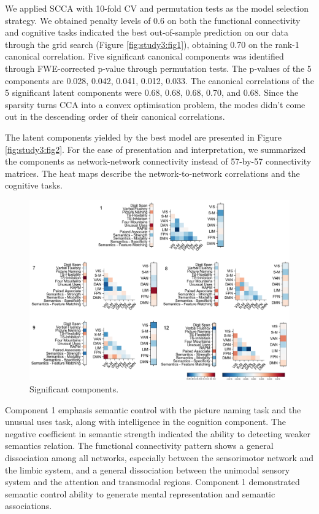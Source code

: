 We applied SCCA with 10-fold CV and permutation tests as the model selection strategy. We obtained penalty levels of 0.6 on both the functional connectivity and cognitive tasks indicated the best out-of-sample prediction on our data through the grid search (Figure \ref{fig:study3:fig1}), obtaining 0.70 on the rank-1 canonical correlation. Five significant canonical components was identified through FWE-corrected p-value through permutation tests. The p-values of the 5 components are 0.028, 0.042, 0.041, 0.012, 0.033. The canonical correlations of the 5 significant latent components were 0.68, 0.68, 0.68, 0.70, and 0.68. Since the sparsity turns CCA into a convex optimisation problem, the modes didn't come out in the descending order of their canonical correlations. 

The latent components yielded by the best model are presented in Figure \ref{fig:study3:fig2}. For the ease of presentation and interpretation, we summarized the components as network-network connectivity instead of 57-by-57 connectivity matrices. The heat maps describe the network-to-network correlations and the cognitive tasks. 

\begin{figure}[H]
	\centering
	\includegraphics[width=1\textwidth]{chapters/img/study3fig3.png}
	\caption{Significant components.} 
	\label{fig:study3:fig3}
\end{figure}

Component 1 emphasis semantic control with the picture naming task and the unusual uses task, along with intelligence in the cognition component. The negative coefficient in semantic strength indicated the ability to detecting weaker semantics relation. The functional connectivity pattern shows a general dissociation among all networks, especially between the sensorimotor network and the limbic system, and a general dissociation between the unimodal sensory system and the attention and transmodal regions. Component 1 demonstrated semantic control ability to generate mental representation and semantic associations. 

